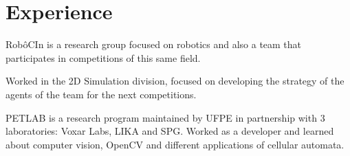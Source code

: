 \documentclass[]{deedy-resume-openfont}
\begin{document}
\begin{minipage}[t]{0.33\textwidth}
\sectionsep



%
%

\end{minipage} 
\hfill
\begin{minipage}[t]{0.66\textwidth} 


\section{Experience}

\vspace{\topsep} %
\begin{tightemize}
\item RobôCIn is a research group focused on robotics and also a team that participates in competitions of this same field.
\item Worked in the 2D Simulation division, focused on developing the strategy of the agents of the team for the next competitions.
\end{tightemize}


\begin{tightemize}
\item PETLAB is a research program maintained by UFPE in partnership with 3 laboratories: Voxar Labs, LIKA and SPG. Worked as a developer and learned about computer vision, OpenCV and  different applications of cellular automata.
\end{tightemize}


\end{minipage}
\end{document}
